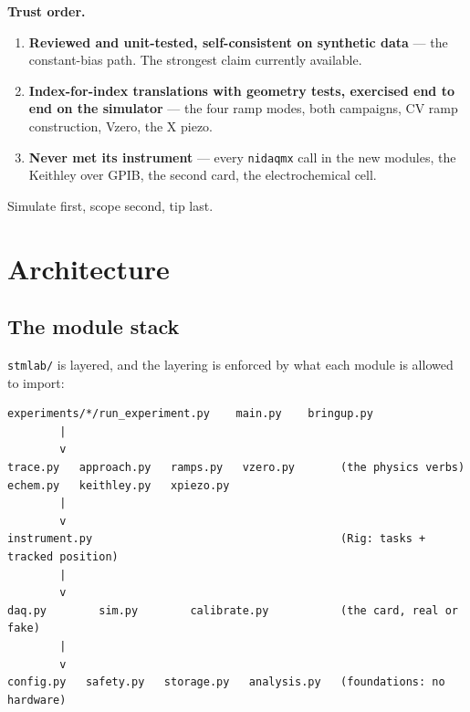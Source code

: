 \textbf{Trust order.}

\begin{enumerate}[leftmargin=*]
\item \textbf{Reviewed and unit-tested, self-consistent on synthetic data} --- the constant-bias path. The strongest claim currently available.
\item \textbf{Index-for-index translations with geometry tests, exercised end to end on the simulator} --- the four ramp modes, both campaigns, CV ramp construction, Vzero, the X piezo.
\item \textbf{Never met its instrument} --- every \texttt{nidaqmx} call in the new modules, the Keithley over GPIB, the second card, the electrochemical cell.
\end{enumerate}

Simulate first, scope second, tip last.

\setcounter{chapter}{0}
\chapter{Architecture}

\section{The module stack}

\texttt{stmlab/\discretionary{}{}{}} is layered, and the layering is enforced by what each module is allowed to import:

\begin{lstlisting}[style=out]
experiments/*/run_experiment.py    main.py    bringup.py
        |
        v
trace.py   approach.py   ramps.py   vzero.py       (the physics verbs)
echem.py   keithley.py   xpiezo.py
        |
        v
instrument.py                                      (Rig: tasks + tracked position)
        |
        v
daq.py        sim.py        calibrate.py           (the card, real or fake)
        |
        v
config.py   safety.py   storage.py   analysis.py   (foundations: no hardware)
\end{lstlisting}

